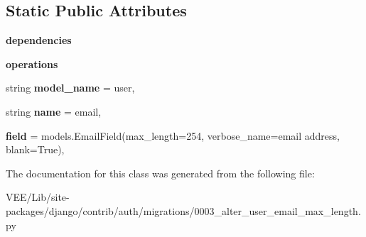 \subsection*{Static Public Attributes}
\begin{DoxyCompactItemize}
\item 
\mbox{\label{classdjango_1_1contrib_1_1auth_1_1migrations_1_10003__alter__user__email__max__length_1_1_migration_a946b46137f3ec9517e54a13261901488}} 
{\bfseries dependencies}
\item 
\mbox{\label{classdjango_1_1contrib_1_1auth_1_1migrations_1_10003__alter__user__email__max__length_1_1_migration_abb73428373657ad40897048c10765b6a}} 
{\bfseries operations}
\item 
\mbox{\label{classdjango_1_1contrib_1_1auth_1_1migrations_1_10003__alter__user__email__max__length_1_1_migration_a738be65b9e86c9e438323de164d28b54}} 
string {\bfseries model\+\_\+name} = \textquotesingle{}user\textquotesingle{},
\item 
\mbox{\label{classdjango_1_1contrib_1_1auth_1_1migrations_1_10003__alter__user__email__max__length_1_1_migration_a5e4d12e3d37ce1662325f49ee498db0b}} 
string {\bfseries name} = \textquotesingle{}email\textquotesingle{},
\item 
\mbox{\label{classdjango_1_1contrib_1_1auth_1_1migrations_1_10003__alter__user__email__max__length_1_1_migration_a556fb473dde07b06cffe9cb2a3332d77}} 
{\bfseries field} = models.\+Email\+Field(max\+\_\+length=254, verbose\+\_\+name=\textquotesingle{}email address\textquotesingle{}, blank=True),
\end{DoxyCompactItemize}


The documentation for this class was generated from the following file\+:\begin{DoxyCompactItemize}
\item 
V\+E\+E/\+Lib/site-\/packages/django/contrib/auth/migrations/0003\+\_\+alter\+\_\+user\+\_\+email\+\_\+max\+\_\+length.\+py\end{DoxyCompactItemize}
